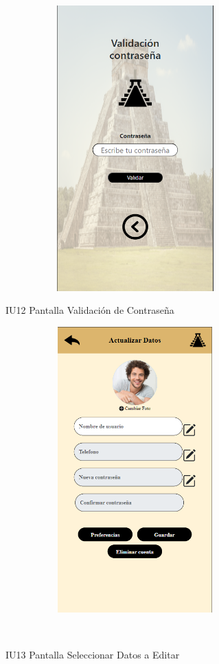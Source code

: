 \begin{figure}[htb]
    \begin{minipage}{1\textwidth}
    \centering
    \includegraphics[width=10cm, height=11cm]{entregable final/pantallasSistema/IU12 Pantalla Validación de Contraseña.png}
    \caption{IU12 Pantalla Validación de Contraseña}
\end{minipage}

    \begin{minipage}{1\textwidth}
        \centering
        \includegraphics[width=10cm, height=11cm]{entregable final/pantallasSistema/IU13 Pantalla Seleccionar Datos a Editar.png}
        \caption{IU13 Pantalla Seleccionar Datos a Editar}
    \end{minipage}
    \\
\end{figure}

